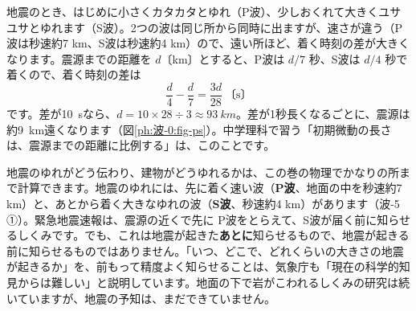 \begin{motto}[2]
地震のとき、はじめに小さくカタカタとゆれ（P波）、少しおくれて大きくユサユサとゆれます（S波）。2つの波は同じ所から同時に出ますが、速さが違う（P波は秒速約7 km、S波は秒速約4 km）ので、遠い所ほど、着く時刻の差が大きくなります。震源までの距離を $d$〔km〕とすると、P波は $d/7$ 秒、S波は $d/4$ 秒で着くので、着く時刻の差は
\[\frac{d}{4}-\frac{d}{7}=\frac{3d}{28}\ \text{〔s〕}\]
です。差が\qty{10}{s}なら、$d=10\times28\div3\approx\qty{93}{km}$。差が1秒長くなるごとに、震源は約\qty{9}{km}遠くなります（図\ref{ph:波-0:fig-ps}）。中学理科で習う「初期微動の長さは、震源までの距離に比例する」は、このことです。
\begin{bkcenter}
\label{ph:波-0:fig-ps}
\end{bkcenter}
\end{motto}
\begin{phmada}
地震のゆれがどう伝わり、建物がどうゆれるかは、この巻の物理でかなりの所まで計算できます。地震のゆれには、先に着く速い波（\textbf{P波}、地面の中を秒速約7 km）と、あとから着く大きなゆれの波（\textbf{S波}、秒速約4 km）があります（波-5 ①）。緊急地震速報は、震源の近くで先に P波をとらえて、S波が届く前に知らせるしくみです。でも、これは地震が起きた\textbf{あとに}知らせるもので、地震が起きる前に知らせるものではありません。「いつ、どこで、どれくらいの大きさの地震が起きるか」を、前もって精度よく知らせることは、気象庁も「現在の科学的知見からは難しい」と説明しています。地面の下で岩がこわれるしくみの研究は続いていますが、地震の予知は、まだできていません。
\end{phmada}

